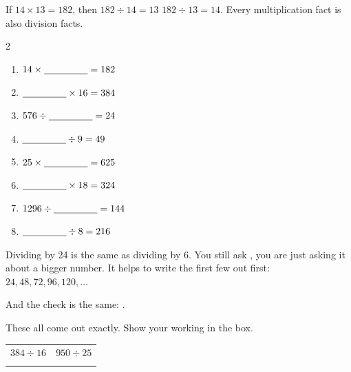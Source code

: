 \documentclass[12pt,a4paper]{article}
\begin{document}

\begin{remember}
  If $14 \times 13 = 182$, then $182 \div 14 = 13$  $182 \div 13 = 14$.
  Every multiplication fact is also  division facts.
\end{remember}

\vspace{2pt}
\begin{multicols}{2}
\begin{enumerate}[label=(\alph*), itemsep=12pt]
  \item $14 \times \blank[1.6cm] = 182$
  \item $\blank[1.6cm] \times 16 = 384$
  \item $576 \div \blank[1.6cm] = 24$
  \item $\blank[1.6cm] \div 9 = 49$
  \item $25 \times \blank[1.6cm] = 625$
  \item $\blank[1.6cm] \times 18 = 324$
  \item $1296 \div \blank[1.6cm] = 144$
  \item $\blank[1.6cm] \div 8 = 216$
\end{enumerate}
\end{multicols}


\begin{remember}
  Dividing by 24 is the same as dividing by 6. You still ask ,
  you are just asking it about a bigger number. It helps to write the first few
  out first: $24, 48, 72, 96, 120, \ldots$

  \smallskip
  And the check is the same: .
\end{remember}

\noindent These all come out exactly. Show your working in the box.

\vspace{4pt}
\noindent
\begin{tabularx}{\textwidth}{|X|X|}
  \hline
  $384 \div 16$ & $950 \div 25$ \\
  \rule[-3.2em]{0pt}{4.0em} & \\
  \hline
\end{tabularx}
\end{document}
